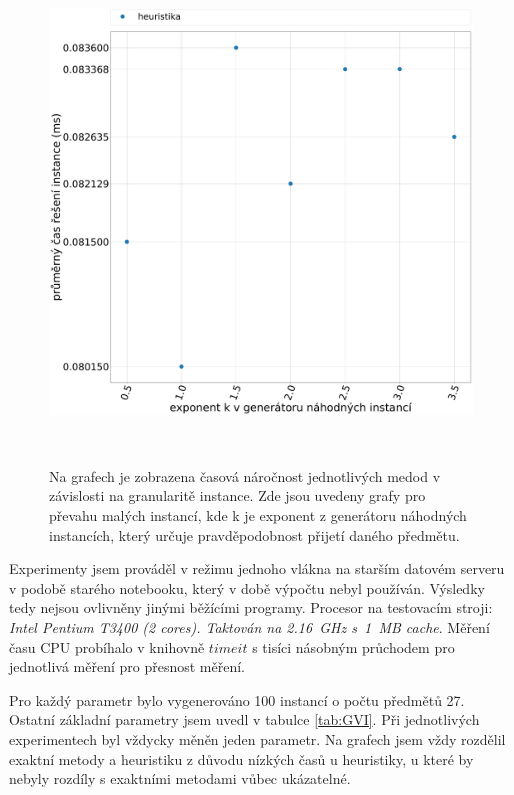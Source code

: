 \documentclass[11pt]{article}
\begin{document}
\begin{figure}
\begin{minipage}[c]{0.49\textwidth}
        \centering \includegraphics[width=\textwidth]{img/GMH.pdf} 
    \end{minipage}
    \\
   \caption{Na grafech je zobrazena časová náročnost jednotlivých medod v závislosti na granularitě instance. Zde jsou uvedeny grafy pro převahu malých instancí, kde k je exponent z generátoru náhodných instancích, který určuje pravděpodobnost přijetí daného předmětu.}\label{fig:GMI}
    \end{figure} 
 

 
 
Experimenty jsem prováděl v režimu jednoho vlákna na starším datovém serveru v podobě starého notebooku, který v době výpočtu nebyl používán. Výsledky tedy nejsou ovlivněny jinými běžícími programy. Procesor na testovacím stroji: \textit{Intel Pentium T3400 (2 cores). Taktován na 2.16~GHz s~1~MB cache}.
Měření času CPU probíhalo v knihovně $timeit$ s tisíci násobným průchodem pro jednotlivá měření pro přesnost měření.

Pro každý parametr bylo vygenerováno 100 instancí o počtu předmětů 27. Ostatní základní parametry jsem uvedl v tabulce \ref{tab:GVI}. Při jednotlivých experimentech byl vždycky měněn jeden parametr. Na grafech jsem vždy rozdělil exaktní metody a heuristiku z důvodu nízkých časů u heuristiky, u které by nebyly rozdíly s exaktními metodami vůbec ukázatelné. 
\end{document}
